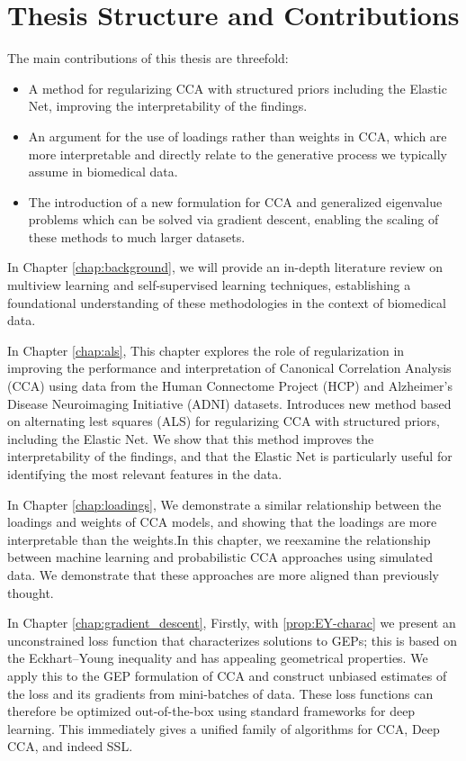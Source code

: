 \section{Thesis Structure and Contributions}

The main contributions of this thesis are threefold:

\begin{itemize}
    \item A method for regularizing CCA with structured priors including the Elastic Net, improving the interpretability of the findings.
    \item An argument for the use of loadings rather than weights in CCA, which are more interpretable and directly relate to the generative process we typically assume in biomedical data.
    \item The introduction of a new formulation for CCA and generalized eigenvalue problems which can be solved via gradient descent, enabling the scaling of these methods to much larger datasets.
\end{itemize}

In Chapter \ref{chap:background}, we will provide an in-depth literature review on multiview learning and self-supervised learning techniques, establishing a foundational understanding of these methodologies in the context of biomedical data.

In Chapter \ref{chap:als}, This chapter explores the role of regularization in improving the performance and interpretation of Canonical
Correlation Analysis (CCA) using data from the Human Connectome Project (HCP) and Alzheimer's Disease Neuroimaging Initiative (ADNI) datasets. Introduces new method based on alternating lest squares (ALS) for regularizing CCA with structured priors, including the Elastic Net. We show that this method improves the interpretability of the findings, and that the Elastic Net is particularly useful for identifying the most relevant features in the data.

In Chapter \ref{chap:loadings}, We demonstrate a similar relationship between the loadings and weights of CCA models, and showing that the loadings are more interpretable than the weights.In this chapter, we reexamine the relationship between machine learning and probabilistic CCA approaches using simulated data.
We demonstrate that these approaches are more aligned than previously thought.

In Chapter \ref{chap:gradient_descent}, Firstly, with \cref{prop:EY-charac} we present an unconstrained loss function that characterizes solutions to GEPs; this is based on the Eckhart--Young inequality and has appealing geometrical properties.
We apply this to the GEP formulation of CCA and construct unbiased estimates of the loss and its gradients from mini-batches of data.
These loss functions can therefore be optimized out-of-the-box using standard frameworks for deep learning. %
This immediately gives a unified family of algorithms for CCA, Deep CCA, and indeed SSL.

